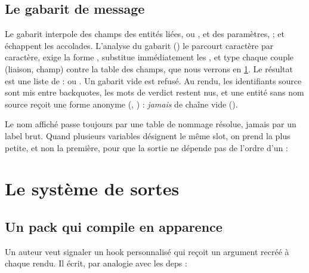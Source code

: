 \subsection{Le gabarit de message}

Le gabarit interpole des champs des entités liées,  ou , et des paramètres,  ; \code{\{\{} et \code{\}\}} échappent les accolades. L'analyse du gabarit () le parcourt caractère par caractère, exige la forme , substitue immédiatement les , et type chaque couple (liaison, champ) contre la table des champs, que nous verrons en \cref{sec:regles-declaratives-sortes}. Le résultat est une liste de  :  ou . Un gabarit vide est refusé. Au rendu, les identifiants source sont mis entre backquotes, les mots de verdict restent nus, et une entité sans nom source reçoit une forme anonyme (, ) : \emph{jamais} de chaîne vide ().

Le nom affiché passe toujours par une table de nommage résolue, jamais par un label brut. Quand plusieurs variables désignent le même slot, on prend la plus petite, et non la première, pour que la sortie ne dépende pas de l'ordre d'un  :


\section{Le système de sortes}
\label{sec:regles-declaratives-sortes}

\subsection{Un pack qui compile en apparence}

Un auteur veut signaler un hook personnalisé qui reçoit un argument recréé à chaque rendu. Il écrit, par analogie avec les deps :



